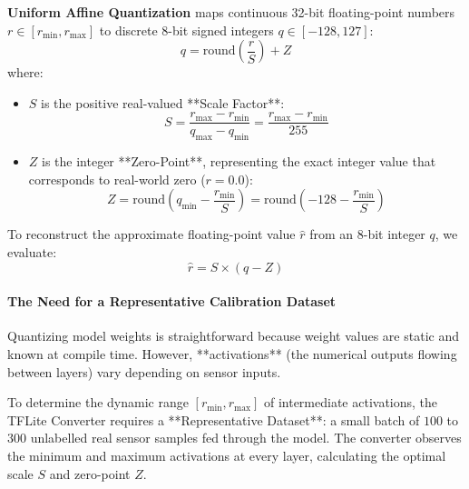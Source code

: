 \textbf{Uniform Affine Quantization} maps continuous 32-bit floating-point numbers $r \in [r_{\min}, r_{\max}]$ to discrete 8-bit signed integers $q \in [-128, 127]$:
\begin{equation}
q = \text{round}\left( \frac{r}{S} \right) + Z\label{eq:quantization_formula}
\end{equation}
where:
\begin{itemize}
    \item $S$ is the positive real-valued **Scale Factor**:
    \begin{equation}
    S = \frac{r_{\max} - r_{\min}}{q_{\max} - q_{\min}} = \frac{r_{\max} - r_{\min}}{255}\label{eq:scale_factor}
    \end{equation}
    \item $Z$ is the integer **Zero-Point**, representing the exact integer value that corresponds to real-world zero ($r = 0.0$):
    \begin{equation}
    Z = \text{round}\left( q_{\min} - \frac{r_{\min}}{S} \right) = \text{round}\left( -128 - \frac{r_{\min}}{S} \right)\label{eq:zero_point}
    \end{equation}
\end{itemize}

To reconstruct the approximate floating-point value $\hat{r}$ from an 8-bit integer $q$, we evaluate:
\begin{equation}
\hat{r} = S \times (q - Z)\label{eq:dequantize_formula}
\end{equation}

\paragraph{The Need for a Representative Calibration Dataset}
Quantizing model weights is straightforward because weight values are static and known at compile time. However, **activations** (the numerical outputs flowing between layers) vary depending on sensor inputs. 

To determine the dynamic range $[r_{\min}, r_{\max}]$ of intermediate activations, the TFLite Converter requires a **Representative Dataset**: a small batch of $100$ to $300$ unlabelled real sensor samples fed through the model. The converter observes the minimum and maximum activations at every layer, calculating the optimal scale $S$ and zero-point $Z$.


